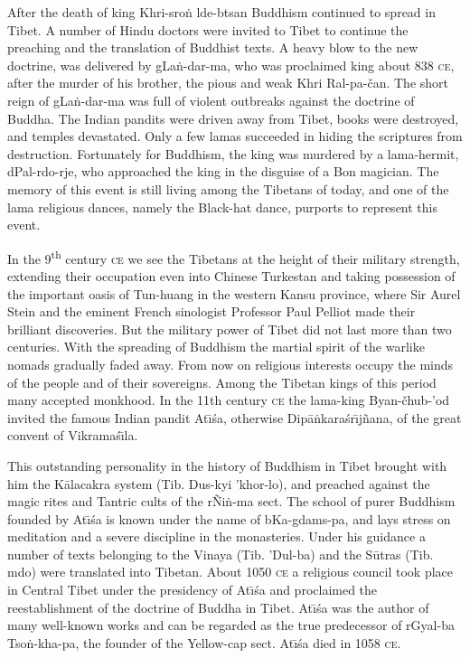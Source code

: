 \documentclass[a4paper, 12pt, oneside]{article}
\begin{document}
After the death of king Khri-sro\.{n} lde-btsan Buddhism continued to spread in Tibet. A number of Hindu doctors were invited to Tibet to continue the preaching and the translation of Buddhist texts. A heavy blow to the new doctrine, was delivered by gLa\.{n}-dar-ma, who was proclaimed king about 838 \textsc{ce}, after the murder of his brother, the pious and weak Khri Ral-pa-čan. The short reign of gLa\.{n}-dar-ma was full of violent outbreaks against the doctrine of Buddha. The Indian pandits were driven away from Tibet, books were destroyed, and temples devastated. Only a few lamas succeeded in hiding the scriptures from destruction. Fortunately for Buddhism, the king was murdered by a lama-hermit, dPal-rdo-rje, who approached the king in the disguise of a Bon magician. The memory of this event is still living among the Tibetans of today, and one of the lama religious dances, namely the Black-hat dance, purports to represent this event.

In the 9\textsuperscript{th} century \textsc{ce} we see the Tibetans at the height of their military strength, extending their occupation even into Chinese Turkestan and taking possession of the important oasis of Tun-huang in the western Kansu province, where Sir Aurel Stein and the eminent French sinologist Professor Paul Pelliot made their brilliant discoveries. But the military power of Tibet did not last more than two centuries. With the spreading of Buddhism the martial spirit of the warlike nomads gradually faded away. From now on religious interests occupy the minds of the people and of their sovereigns. Among the Tibetan kings of this period many accepted monkhood. In the 11th century \textsc{ce} the lama-king Byan-čhub-'od invited the famous Indian pandit At\={\i}\'{s}a, otherwise Dip\={a}\.{n}kara\'{s}r\={\i}j\~{n}ana, of the great convent of Vikrama\'{s}\={\i}la.

This outstanding personality in the history of Buddhism in Tibet brought with him the K\={a}lacakra system (Tib. Dus-kyi 'khor-lo), and preached against the magic rites and Tantric cults of the rÑi\.{n}-ma sect. The school of purer Buddhism founded by At\={\i}\'{s}a is known under the name of bKa-gdams-pa, and lays stress on meditation and a severe discipline in the monasteries. Under his guidance a number of texts belonging to the Vinaya (Tib. 'Dul-ba) and the S\={u}tras (Tib. mdo) were translated into Tibetan. About 1050 \textsc{ce} a religious council took place in Central Tibet under the presidency of At\={\i}\'{s}a and proclaimed the reestablishment of the doctrine of Buddha in Tibet. At\={\i}\'{s}a was the author of many well-known works and can be regarded as the true predecessor of rGyal-ba Tso\.{n}-kha-pa, the founder of the Yellow-cap sect. At\={\i}\'{s}a died in 1058 \textsc{ce}.
\end{document}
